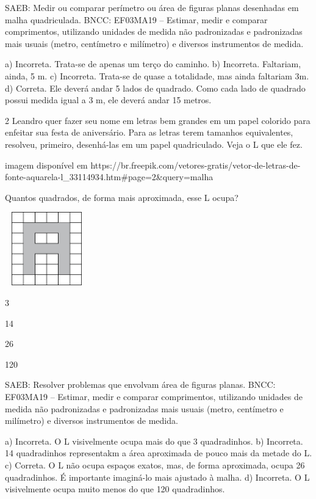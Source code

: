 \begin{multicols}{2}
SAEB: Medir ou comparar perímetro ou área de figuras planas desenhadas em malha quadriculada. 
BNCC: EF03MA19 -- Estimar, medir e comparar comprimentos, utilizando unidades de medida
não padronizadas e padronizadas mais usuais (metro, centímetro e milímetro) e diversos
instrumentos de medida.

a) Incorreta. Trata-se de apenas um terço do caminho.
b) Incorreta. Faltariam, ainda, 5 m.
c) Incorreta. Trata-se de quase a totalidade, mas ainda faltariam 3m.
d) Correta. Ele deverá andar 5 lados de quadrado. Como cada lado de quadrado possui
medida igual a 3 m, ele deverá andar 15 metros.

\num{2} Leandro quer fazer seu nome em letras bem grandes em um papel colorido para enfeitar sua festa de aniversário. Para as letras terem tamanhos equivalentes, resolveu, primeiro, desenhá-las em um papel quadriculado. Veja o L que ele fez.

\Inserir imagem disponível em https://br.freepik.com/vetores-gratis/vetor-de-letras-de-fonte-aquarela-l_33114934.htm#page=2&query=malha%

Quantos quadrados, de forma mais aproximada, esse L ocupa?

\includegraphics[width=1.42949in,height=1.25160in]{media/image62.png}

\begin{escolha}
\item
  3
\item
  14
\item
  26
\item
  120
\end{escolha}

SAEB: Resolver problemas que envolvam área de figuras planas. 
BNCC: EF03MA19 -- Estimar, medir e comparar comprimentos, utilizando unidades de medida
não padronizadas e padronizadas mais usuais (metro, centímetro e milímetro) e diversos
instrumentos de medida.

a) Incorreta. O L visivelmente ocupa mais do que 3 quadradinhos.
b) Incorreta. 14 quadradinhos representakm a área aproximada de pouco mais da metade do L.
c) Correta. O L não ocupa espaços exatos, mas, de forma aproximada, ocupa 26 quadradinhos. É importante imaginá-lo mais ajustado à malha.
d) Incorreta. O L visivelmente ocupa muito menos do que 120 quadradinhos.


\end{multicols}
